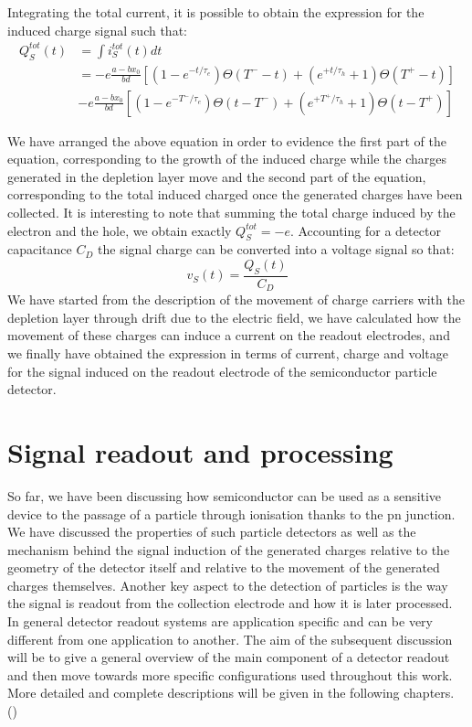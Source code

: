 		Integrating the total current, it is possible to obtain the expression for the induced charge signal such that: 
		\begin{equation}
			\begin{split}
				Q_S^{tot}(t) 	&= \int i_S^{tot}(t) dt \\
											&= -e \frac{a-bx_0}{bd} {\left[ {\left( 1- e^{-t/\tau_e}\right)\Theta(T^- - t)} + {\left( e^{+t/\tau_h} + 1  \right) \Theta(T^+ - t)} \right]} \\
											& -e \frac{a-bx_0}{bd} {\left[ {\left( 1- e^{-T^-/\tau_e}\right)\Theta(t - T^- )} + {\left( e^{+T^+/\tau_h} + 1  \right) \Theta(t - T^+)} \right]}
			\end{split}
			\label{eq:induced_charge}
		\end{equation}

		We have arranged the above equation in order to evidence the first part of the equation, corresponding to the growth of the induced charge while the charges generated in the depletion layer move and the second part of the equation, corresponding to the total induced charged once the generated charges have been collected. It is interesting to note that summing the total charge induced by the electron and the hole, we obtain exactly $Q_S^{tot} = -e $. 
		Accounting for a detector capacitance $C_D$ the signal charge can be converted into a voltage signal so that: 
		\begin{equation}
			v_S(t) = \frac{Q_S(t)}{C_D}
		\end{equation}
		We have started from the description of the movement of charge carriers with the depletion layer through drift due to the electric field, we have calculated how the movement of these charges can induce a current on the readout electrodes, and we finally have obtained the expression in terms of current, charge and voltage for the signal induced on the readout electrode of the semiconductor particle detector.
		\clearpage

	\section{Signal readout and processing}\label{sec:2.3}
	So far, we have been discussing how semiconductor can be used as a sensitive device to the passage of a particle through ionisation thanks to the pn junction. We have discussed the properties of such particle detectors as well as the mechanism behind the signal induction of the generated charges relative to the geometry of the detector itself and relative to the movement of the generated charges themselves. Another key aspect to the detection of particles is the way the signal is readout from the collection electrode and how it is later processed. In general detector readout systems are application specific and can be very different from one application to another. The aim of the subsequent discussion will be to give a general overview of the main component of a detector readout and then move towards more specific configurations used throughout this work. More detailed and complete descriptions will be given in the following chapters. () 


